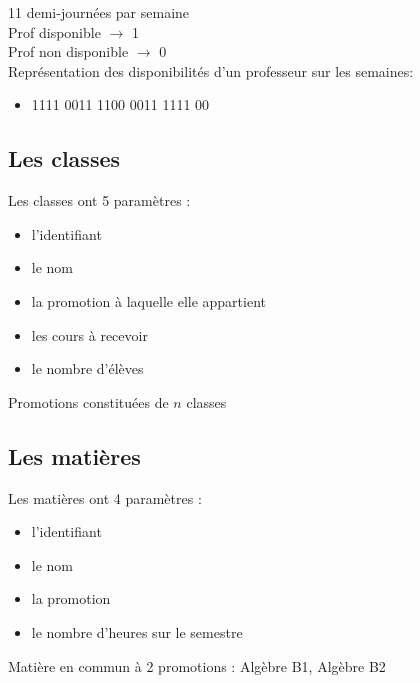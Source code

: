 \documentclass{beamer}
\begin{document}
\begin{frame}
11 demi-journées par semaine\\

Prof disponible  $\rightarrow$ 1\\
Prof non disponible  $\rightarrow$ 0\\
\vspace{\baselineskip}
Représentation des disponibilités d'un professeur sur les semaines:
\begin{itemize}
\item 1111 0011 1100 0011 1111 00
\end{itemize}
\end{frame}

\subsection{Les classes}
\begin{frame}
Les classes ont 5 paramètres : 
\begin{itemize}
\item l'identifiant
\item le nom
\item la promotion à laquelle elle appartient
\item les cours à recevoir
\item le nombre d'élèves\\
\end{itemize}
\vspace{\baselineskip}
Promotions constituées de $n$ classes
\end{frame}

\subsection{Les matières}
\begin{frame}
Les matières ont 4 paramètres : 
\begin{itemize}
\item l'identifiant
\item le nom
\item la promotion
\item le nombre d'heures sur le semestre\\
\end{itemize}
\vspace{\baselineskip}
Matière en commun à 2 promotions : Algèbre B1, Algèbre B2\\ 
\end{frame}
\end{document}
